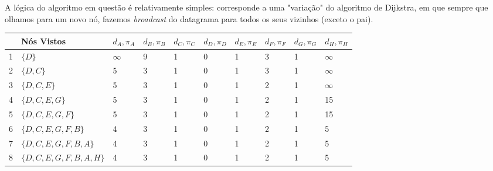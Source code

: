 
A lógica do algoritmo em questão é relativamente simples: corresponde a uma
"variação" do algoritmo de Dijkstra, em que sempre que olhamos para um novo nó, fazemos
\textit{broadcast} do datagrama para todos os seus vizinhos (exceto o pai).

\begin{table}[H]
  \centering
  \begin{tabular}{l|l|l|l|l|l|l|l|l|l}
      & Nós Vistos                   & $d_A, \pi_A$ & $d_B, \pi_B$ & $d_C, \pi_C$ & $d_D, \pi_D$ & $d_E, \pi_E$ & $d_F, \pi_F$ & $d_G, \pi_G$ & $d_H, \pi_H$ \\ \hline
    1 & $\{D\}$                      & $\infty$     & 9            & 1            & 0            & 1            & 3            & 1            & $\infty$     \\
    2 & $\{D, C\}$                   & 5            & 3            & 1            & 0            & 1            & 3            & 1            & $\infty$     \\
    3 & $\{D, C, E\}$                & 5            & 3            & 1            & 0            & 1            & 2            & 1            & $\infty$     \\
    4 & $\{D, C, E, G\}$             & 5            & 3            & 1            & 0            & 1            & 2            & 1            & 15           \\
    5 & $\{D, C, E, G, F\}$          & 5            & 3            & 1            & 0            & 1            & 2            & 1            & 15           \\
    6 & $\{D, C, E, G, F, B\}$       & 4            & 3            & 1            & 0            & 1            & 2            & 1            & 5            \\
    7 & $\{D, C, E, G, F, B, A\}$    & 4            & 3            & 1            & 0            & 1            & 2            & 1            & 5            \\
    8 & $\{D, C, E, G, F, B, A, H\}$ & 4            & 3            & 1            & 0            & 1            & 2            & 1            & 5
  \end{tabular}
\end{table}

\begin{figure}[H]
  \centering
  
\end{figure}
